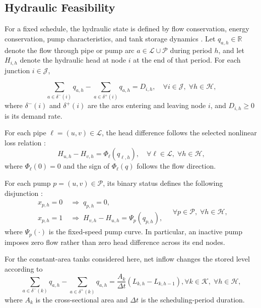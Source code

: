 \documentclass[Journal,letterpaper,InsideFigs]{ascelike-new}
\begin{document}
\subsection{Hydraulic Feasibility}

For a fixed schedule, the hydraulic state is defined by flow conservation, energy conservation, pump characteristics, and tank storage dynamics \cite{Bonvin2021}. Let $q_{a,h}\in\mathbb{R}$ denote the flow through pipe or pump arc $a\in\mathcal{L}\cup\mathcal{P}$ during period $h$, and let $H_{i,h}$ denote the hydraulic head at node $i$ at the end of that period. For each junction $i\in\mathcal{J}$,

\begin{equation}
	\sum_{a \in \delta^-(i)} q_{a,h}
	- \sum_{a \in \delta^+(i)} q_{a,h}
	= D_{i,h},
	\quad \forall i \in \mathcal{J}, \; \forall h \in \mathcal{H},
	\label{eq:flow_conservation}
\end{equation}
where $\delta^-(i)$ and $\delta^+(i)$ are the arcs entering and leaving node $i$, and $D_{i,h}\geq 0$ is its demand rate.

For each pipe $\ell=(u,v)\in\mathcal{L}$, the head difference follows the selected nonlinear loss relation \cite{Brown2002,Burgschweiger2009a}:
\begin{equation}
	H_{u,h}-H_{v,h}=\Phi_\ell(q_{\ell,h}),
	\quad \forall \ell\in\mathcal{L}, \; \forall h\in\mathcal{H},
	\label{eq:pipe_head_loss}
\end{equation}
where $\Phi_\ell(0)=0$ and the sign of $\Phi_\ell(q)$ follows the flow direction.

For each pump $p=(u,v)\in\mathcal{P}$, its binary status defines the following disjunction \cite{Burgschweiger2009b,Morsi2012}:
\begin{equation}
	\begin{aligned}
		x_{p,h}=0 & \;\Longrightarrow\; q_{p,h}=0, \\
		x_{p,h}=1 & \;\Longrightarrow\;
		H_{v,h}-H_{u,h}=\Psi_p(q_{p,h}),
	\end{aligned}
	\quad \forall p\in\mathcal{P}, \; \forall h\in\mathcal{H},
	\label{eq:pump_head}
\end{equation}
where $\Psi_p(\cdot)$ is the fixed-speed pump curve. In particular, an inactive pump imposes zero flow rather than zero head difference across its end nodes.

For the constant-area tanks considered here, net inflow changes the stored level according to
\begin{equation}
	\sum_{a \in \delta^-(k)} q_{a,h} - \sum_{a \in \delta^+(k)} q_{a,h} = \frac{A_k}{\Delta t} (L_{k,h} - L_{k,h-1}), \forall k \in \mathcal{K}, \; \forall h \in \mathcal{H},
	\label{eq:tank_dynamics}
\end{equation}
where $A_k$ is the cross-sectional area and $\Delta t$ is the scheduling-period duration.
\end{document}
